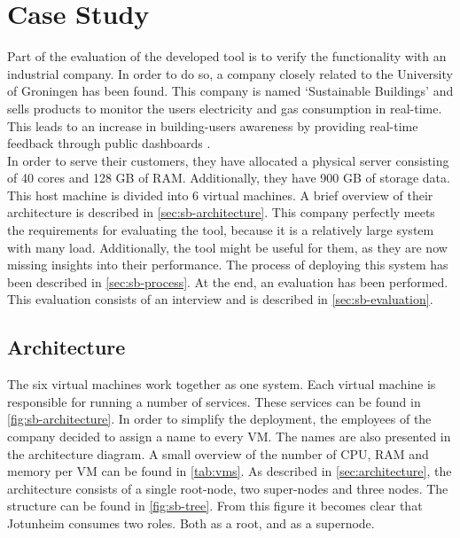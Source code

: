 \chapter{Case Study}\label{ch:case_study}
Part of the evaluation of the developed tool is to verify the functionality with an industrial company. In order to do so, a company closely related to the University of Groningen has been found. This company is named `Sustainable Buildings' and sells products to monitor the users electricity and gas consumption in real-time. This leads to an increase in building-users awareness by providing real-time feedback through public dashboards \cite{sb}.\\

\noindent
In order to serve their customers, they have allocated a physical server consisting of 40 cores and 128 GB of RAM. Additionally, they have 900 GB of storage data. This host machine is divided into 6 virtual machines. A brief overview of their architecture is described in \autoref{sec:sb-architecture}. This company perfectly meets the requirements for evaluating the tool, because it is a relatively large system with many load. Additionally, the tool might be useful for them, as they are now missing insights into their performance. The process of deploying this system has been described in \autoref{sec:sb-process}. At the end, an evaluation has been performed. This evaluation consists of an interview and is described in \autoref{sec:sb-evaluation}.

\section{Architecture} \label{sec:sb-architecture}
The six virtual machines work together as one system. Each virtual machine is responsible for running a number of services. These services can be found in \autoref{fig:sb-architecture}. In order to simplify the deployment, the employees of the company decided to assign a name to every VM. The names are also presented in the architecture diagram. A small overview of the number of CPU, RAM and memory per VM can be found in \autoref{tab:vms}. As described in \autoref{sec:architecture}, the architecture consists of a single root-node, two super-nodes and three nodes. The structure can be found in \autoref{fig:sb-tree}. From this figure it becomes clear that Jotunheim consumes two roles. Both as a root, and as a supernode.


